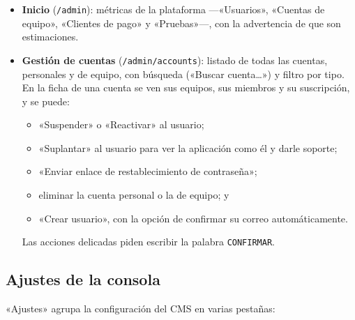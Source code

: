 \begin{itemize}
  \item \textbf{Inicio} (\texttt{/admin}): métricas de la plataforma
        ---«Usuarios», «Cuentas de equipo», «Clientes de pago» y «Pruebas»---,
        con la advertencia de que son estimaciones.
  \item \textbf{Gestión de cuentas} (\texttt{/admin/accounts}): listado de
        todas las cuentas, personales y de equipo, con búsqueda («Buscar
        cuenta\ldots») y filtro por tipo. En la ficha de una cuenta se ven sus
        equipos, sus miembros y su suscripción, y se puede:
        \begin{itemize}
          \item «Suspender» o «Reactivar» al usuario;
          \item «Suplantar» al usuario para ver la aplicación como él y darle
                soporte;
          \item «Enviar enlace de restablecimiento de contraseña»;
          \item eliminar la cuenta personal o la de equipo; y
          \item «Crear usuario», con la opción de confirmar su correo
                automáticamente.
        \end{itemize}
        Las acciones delicadas piden escribir la palabra
        \texttt{CONFIRMAR}.
\end{itemize}

\subsection{Ajustes de la consola}
\label{sec:ug-ajustes}

«Ajustes» agrupa la configuración del CMS en varias pestañas:

